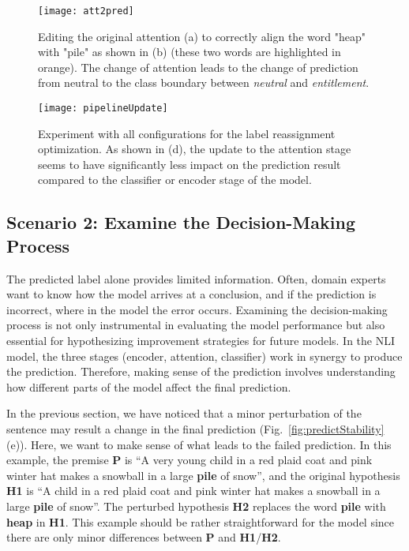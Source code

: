 \begin{figure}[htbp]
\centering
\vspace{-2mm}
 \texttt{[image: att2pred]}
 \vspace{-4mm}
 \caption{
Editing the original attention (a) to correctly align the word "heap" with "pile" as shown in (b) (these two words are highlighted in orange).
The change of attention leads to the change of prediction from neutral to the class boundary between \emph{neutral} and \emph{entitlement}.
%
}
\label{fig:att2pred}
\vspace{-3mm}
\end{figure}

\begin{figure*}[t]
\centering
\vspace{-3mm}
 \texttt{[image: pipelineUpdate]}
  \vspace{-2mm}
 \caption{
Experiment with all configurations for the label reassignment optimization. As shown in (d), the update to the attention stage seems to have significantly less impact on the prediction result compared to the classifier or encoder stage of the model.
 }
  \vspace{-4mm}
\label{fig:pipelineUpdate}
\end{figure*}

\subsection{Scenario 2: Examine the Decision-Making Process}
The predicted label alone provides limited information. Often, domain experts want to know how the model arrives at a conclusion, and if the prediction is incorrect, where in the model the error occurs.
Examining the decision-making process is not only instrumental in evaluating the model performance but also essential for hypothesizing improvement strategies for future models.
%
In the NLI model, the three stages (encoder, attention, classifier) work in synergy to produce the prediction.
Therefore, making sense of the prediction involves understanding how different parts of the model affect the final prediction.

In the previous section, we have noticed that a minor perturbation of the sentence may result a change in the final prediction (Fig.~\ref{fig:predictStability}(e)). Here, we want to make sense of what leads to the failed prediction. In this example, the premise \textbf{P} is ``A very young child in a red plaid coat and pink winter hat makes a snowball in a large \textbf{pile} of snow'', and the original hypothesis \textbf{H1} is ``A child in a red plaid coat and pink winter hat makes a snowball in a large \textbf{pile} of snow''. The perturbed hypothesis \textbf{H2} replaces the word \textbf{pile} with \textbf{heap} in \textbf{H1}. This example should be rather straightforward for the model since there are only minor differences between \textbf{P} and \textbf{H1}/\textbf{H2}.

